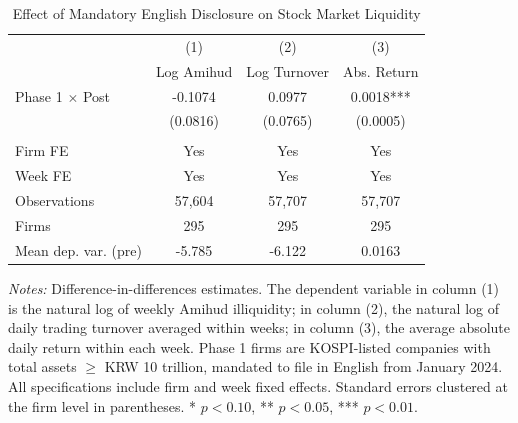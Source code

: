 \begin{table}[H]
\centering
\caption{Effect of Mandatory English Disclosure on Stock Market Liquidity}
\label{tab:main}
\begin{threeparttable}
\begin{tabular}{lccc}
\toprule
 & (1) & (2) & (3) \\
 & Log Amihud & Log Turnover & Abs. Return \\
\midrule
Phase 1 $\times$ Post & -0.1074 & 0.0977 & 0.0018*** \\
 & (0.0816) & (0.0765) & (0.0005) \\
 \\
\midrule
Firm FE & Yes & Yes & Yes \\
Week FE & Yes & Yes & Yes \\
Observations & 57,604 & 57,707 & 57,707 \\
Firms & 295 & 295 & 295 \\
Mean dep. var. (pre) & -5.785 & -6.122 & 0.0163 \\
\bottomrule
\end{tabular}
\begin{tablenotes}[flushleft]
\small
\item \textit{Notes:} Difference-in-differences estimates. The dependent variable in column (1) is the natural log of weekly Amihud illiquidity; in column (2), the natural log of daily trading turnover averaged within weeks; in column (3), the average absolute daily return within each week. Phase 1 firms are KOSPI-listed companies with total assets $\geq$ KRW 10 trillion, mandated to file in English from January 2024. All specifications include firm and week fixed effects. Standard errors clustered at the firm level in parentheses. * $p<0.10$, ** $p<0.05$, *** $p<0.01$.
\end{tablenotes}
\end{threeparttable}
\end{table}
